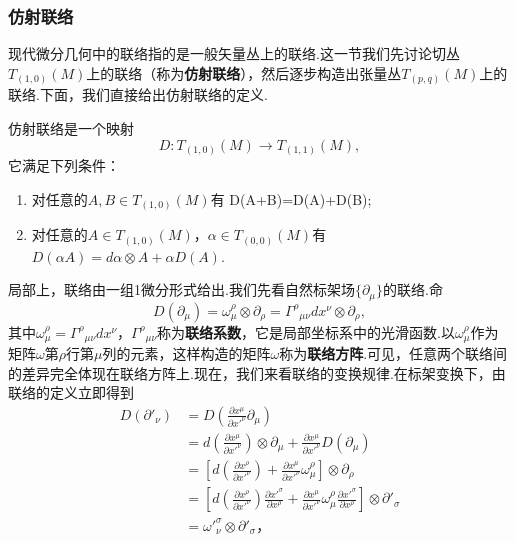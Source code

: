 \documentclass[10pt]{article}
\begin{document}
	\subsubsection{仿射联络}
	现代微分几何中的联络指的是一般矢量丛上的联络.这一节我们先讨论切丛$T_{(1,0)}(M)$上的联络（称为\textbf{仿射联络}），然后逐步构造出张量丛$T_{(p,q)}(M)$上的联络.下面，我们直接给出仿射联络的定义.
	\begin{definition}
		仿射联络是一个映射
		\begin{equation*}
			D:T_{(1,0)}(M)\rightarrow T_{(1,1)}(M),
		\end{equation*}
		它满足下列条件：
		\begin{enumerate}
			\item 对任意的$A,B\in T_{(1,0)}(M)$有 D(A+B)=D(A)+D(B);						
			\item 对任意的$A\in T_{(1,0)}(M)，\alpha\in T_{(0,0)}(M)$有$D(\alpha A)=d\alpha\otimes A+\alpha D(A)$.
		\end{enumerate}
	\end{definition}
	局部上，联络由一组1微分形式给出.我们先看自然标架场$\{\partial_\mu\}$的联络.命
	\begin{equation}
	D(\partial_\mu)=\omega^\rho_\mu \otimes\partial_\rho={\Gamma^\rho}_{\mu\nu}dx^\nu\otimes \partial_\rho,
	\end{equation} 
	其中$\omega^\rho_\mu={\Gamma^\rho}_{\mu\nu}dx^\nu$，${\Gamma^\rho}_{\mu\nu}$称为\textbf{联络系数}，它是局部坐标系中的光滑函数.以$\omega^\rho_\mu$作为矩阵$\omega$第$\rho$行第$\mu$列的元素，这样构造的矩阵$\omega$称为\textbf{联络方阵}.可见，任意两个联络间的差异完全体现在联络方阵上.现在，我们来看联络的变换规律.在标架变换下，由联络的定义立即得到			 
	\begin{equation}
		\begin{split}
		D(\partial'_\nu) &= D\left(\frac{\partial{x^\mu}}{\partial{x'}^\nu}{\partial}_\mu\right) \\
		&= d\left(\frac{\partial{x^\mu}}{\partial{x'}^\nu}\right)\otimes{\partial}_\mu+\frac{\partial{x^\mu}}{\partial{x'}^\nu}D\left({\partial}_\mu\right)\\
		&= \left[d\left(\frac{\partial{x^\rho}}{\partial{x'}^\nu}\right)+\frac{\partial{x^\mu}}{\partial{x'}^\nu}\omega^\rho_\mu\right]\otimes{\partial}_\rho\\
		&= \left[d\left(\frac{\partial{x^\rho}}{\partial{x'}^\nu}\right)\frac{\partial{{x'}^\sigma}}{\partial{x^\rho}}+\frac{\partial{x^\mu}}{\partial{x'}^\nu}\omega^\rho_\mu\frac{\partial{{x'}^\sigma}}{\partial{x^\rho}}\right]\otimes\partial'_\sigma\\
		&={\omega'}^\sigma_\nu\otimes\partial'_\sigma，
		\end{split}
	\end{equation}
\end{document}
